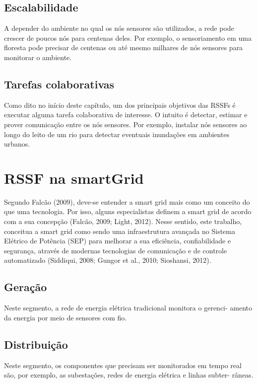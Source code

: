 	\subsection{Escalabilidade} 
	A depender do ambiente no qual os nós sensores são utilizados, a rede pode crescer de poucos nós para centenas deles. Por exemplo, o sensoriamento em uma floresta pode precisar de centenas ou até mesmo milhares de nós sensores para monitorar o ambiente.
	
	\subsection{Tarefas colaborativas}
	Como dito no início deste capítulo, um dos principais objetivos das RSSFs é executar alguma tarefa colaborativa de interesse. O intuito é detectar, estimar e prover comunicação entre os nós sensores. Por exemplo, instalar nós sensores ao longo do leito de um rio para detectar eventuais inundações em ambientes urbanos.

\section{RSSF na smartGrid}

Segundo Falcão (2009), deve-se entender a smart grid mais como um conceito do que uma tecnologia. Por isso, alguns especialistas definem a smart grid de acordo com a sua concepção (Falcão, 2009; Light, 2012). Nesse sentido, este trabalho, conceitua a smart grid como sendo uma infraestrutura avançada no Sistema Elétrico de Potência (SEP) para melhorar a sua eficiência, confiabilidade e segurança, através de modernas tecnologias de comunicação e de controle automatizado (Siddiqui, 2008; Gungor et al., 2010; Sioshansi, 2012).


\subsection{Geração}
Neste segmento, a rede de energia elétrica tradicional monitora o gerenci- amento da energia por meio de sensores com fio. 

\subsection{Distribuição}
Neste segmento, os componentes que precisam ser monitorados em tempo real são, por exemplo, as subestações, redes de energia elétrica e linhas subter- râneas.

